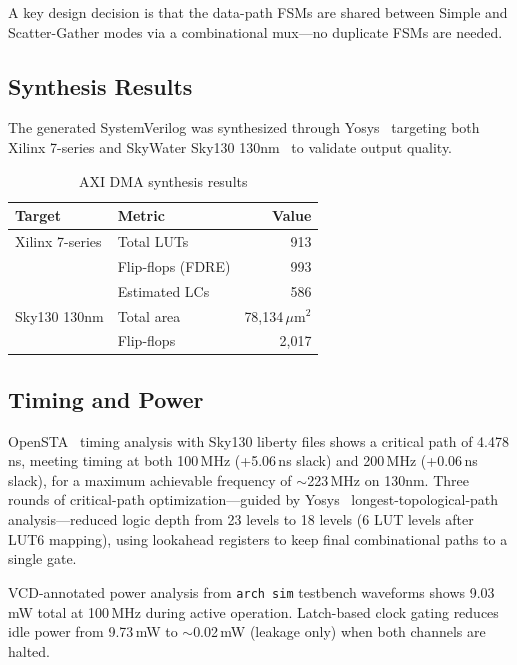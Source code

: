 \documentclass[11pt,twocolumn]{article}
\begin{document}
A key design decision is that the data-path FSMs are shared between Simple and Scatter-Gather modes via a combinational mux---no duplicate FSMs are needed.

\subsection{Synthesis Results}

The generated SystemVerilog was synthesized through Yosys~\cite{yosys} targeting both Xilinx 7-series and SkyWater Sky130 130nm~\cite{sky130pdk} to validate output quality.

\begin{table}[t]
\centering
\caption{AXI DMA synthesis results}
\label{tab:dmasyn}
\footnotesize
\begin{tabular}{@{}llr@{}}
\toprule
\textbf{Target} & \textbf{Metric} & \textbf{Value} \\
\midrule
Xilinx 7-series & Total LUTs & 913 \\
                & Flip-flops (FDRE) & 993 \\
                & Estimated LCs & 586 \\
\midrule
Sky130 130nm    & Total area & 78,134\,$\mu$m$^2$ \\
                & Flip-flops & 2,017 \\
\bottomrule
\end{tabular}
\end{table}

\subsection{Timing and Power}

OpenSTA~\cite{opensta} timing analysis with Sky130 liberty files shows a critical path of 4.478\,ns, meeting timing at both 100\,MHz (+5.06\,ns slack) and 200\,MHz (+0.06\,ns slack), for a maximum achievable frequency of ${\sim}$223\,MHz on 130nm. Three rounds of critical-path optimization---guided by Yosys~\cite{yosys} longest-topological-path analysis---reduced logic depth from 23 levels to 18 levels (6 LUT levels after LUT6 mapping), using lookahead registers to keep final combinational paths to a single gate.

VCD-annotated power analysis from \texttt{arch sim} testbench waveforms shows 9.03\,mW total at 100\,MHz during active operation. Latch-based clock gating reduces idle power from 9.73\,mW to ${\sim}$0.02\,mW (leakage only) when both channels are halted.
\end{document}
